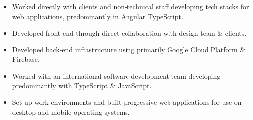 \documentclass[10pt, a4paper]{altacv}
\begin{document}
    \singlespacing
    \begin{fullwidth}
    \makecvheader
    \end{fullwidth}
	\begin{itemize}
		\item Worked directly with clients and non-technical staff developing tech stacks for web applications, predominantly in Angular TypeScript.
		\item Developed front-end through direct collaboration with design team \& clients.
		\item Developed back-end infrastructure using primarily Google Cloud Platform \& Firebase.
	\end{itemize}
        \begin{itemize}
        	   \item Worked with an international software development team developing predominantly with TypeScript \& JavaScript.
            \item Set up work environments and built progressive web applications for use on desktop and mobile operating systems.
       \end{itemize}
\end{document}
